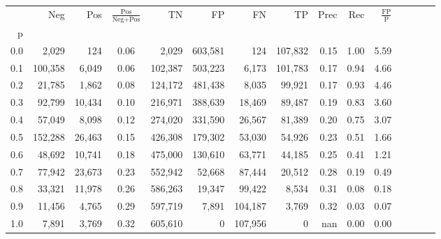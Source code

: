 \begin{tabular}{rrrcrrrrrrrrrrr}
\toprule
{} &      Neg &     Pos & $\frac{\text{Pos}}{\text{Neg}+\text{Pos}}$ &       TN &       FP &       FN &       TP &  Prec &   Rec & $\frac{\text{FP}}{\text{P}}$ \\
p   &          &         &                                            &          &          &          &          &       &       &                              \\
\midrule
0.0 &    2,029 &     124 &                                       0.06 &    2,029 &  603,581 &      124 &  107,832 &  0.15 &  1.00 &                         5.59 \\
0.1 &  100,358 &   6,049 &                                       0.06 &  102,387 &  503,223 &    6,173 &  101,783 &  0.17 &  0.94 &                         4.66 \\
0.2 &   21,785 &   1,862 &                                       0.08 &  124,172 &  481,438 &    8,035 &   99,921 &  0.17 &  0.93 &                         4.46 \\
0.3 &   92,799 &  10,434 &                                       0.10 &  216,971 &  388,639 &   18,469 &   89,487 &  0.19 &  0.83 &                         3.60 \\
0.4 &   57,049 &   8,098 &                                       0.12 &  274,020 &  331,590 &   26,567 &   81,389 &  0.20 &  0.75 &                         3.07 \\
0.5 &  152,288 &  26,463 &                                       0.15 &  426,308 &  179,302 &   53,030 &   54,926 &  0.23 &  0.51 &                         1.66 \\
0.6 &   48,692 &  10,741 &                                       0.18 &  475,000 &  130,610 &   63,771 &   44,185 &  0.25 &  0.41 &                         1.21 \\
0.7 &   77,942 &  23,673 &                                       0.23 &  552,942 &   52,668 &   87,444 &   20,512 &  0.28 &  0.19 &                         0.49 \\
0.8 &   33,321 &  11,978 &                                       0.26 &  586,263 &   19,347 &   99,422 &    8,534 &  0.31 &  0.08 &                         0.18 \\
0.9 &   11,456 &   4,765 &                                       0.29 &  597,719 &    7,891 &  104,187 &    3,769 &  0.32 &  0.03 &                         0.07 \\
1.0 &    7,891 &   3,769 &                                       0.32 &  605,610 &        0 &  107,956 &        0 &   nan &  0.00 &                         0.00 \\
\bottomrule
\end{tabular}
